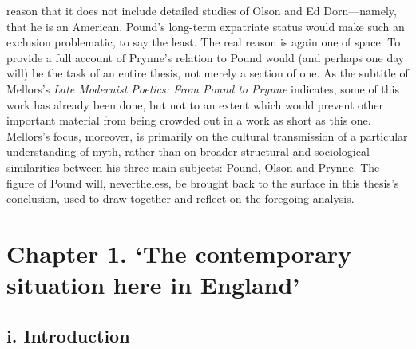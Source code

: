 \documentclass[]{article}
\begin{document}
reason that it does not include detailed studies of Olson and Ed
Dorn—namely, that he is an American. Pound’s long-term expatriate status
would make such an exclusion problematic, to say the least. The real
reason is again one of space. To provide a full account of Prynne’s
relation to Pound would (and perhaps one day will) be the task of an
entire thesis, not merely a section of one. As the subtitle of Mellors’s
\emph{Late Modernist Poetics: From Pound to Prynne} indicates, some of
this work has already been done, but not to an extent which would
prevent other important material from being crowded out in a work as
short as this one. Mellors’s focus, moreover, is primarily on the
cultural transmission of a particular understanding of myth, rather than
on broader structural and sociological similarities between his three
main subjects: Pound, Olson and Prynne. The figure of Pound will,
nevertheless, be brought back to the surface in this thesis’s
conclusion, used to draw together and reflect on the foregoing analysis.
\newpage

\section{Chapter 1. ‘The contemporary situation here in
England’}\label{chapter-1.-the-contemporary-situation-here-in-england}

\subsection{i. Introduction}\label{i.-introduction}
\end{document}

